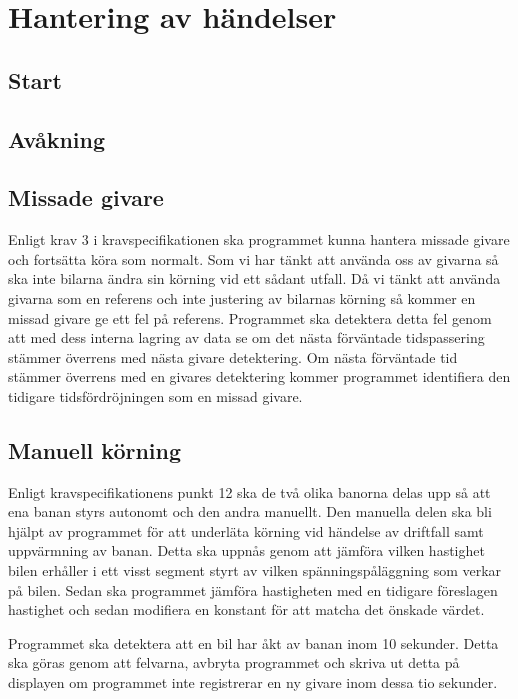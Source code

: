 \section{Hantering av händelser}


\subsection{Start}


\subsection{Avåkning}



\subsection{Missade givare}

Enligt krav 3 i kravspecifikationen ska programmet kunna hantera missade givare och fortsätta köra som normalt. Som vi har tänkt att använda oss av givarna så ska inte bilarna ändra sin körning vid ett sådant utfall. Då vi tänkt att använda givarna som en referens och inte justering av bilarnas körning så kommer en missad givare ge ett fel på referens. Programmet ska detektera detta fel genom att med dess interna lagring av data se om det nästa förväntade tidspassering stämmer överrens med nästa givare detektering. Om nästa förväntade tid stämmer överrens med en givares detektering kommer programmet identifiera den tidigare tidsfördröjningen som en missad givare.


\subsection{Manuell körning}
Enligt kravspecifikationens punkt 12 ska de två olika banorna delas upp så att ena banan styrs autonomt och den andra manuellt. 
Den manuella delen ska bli hjälpt av programmet för att underläta körning vid händelse av driftfall samt uppvärmning av banan.
Detta ska uppnås genom att jämföra vilken hastighet bilen erhåller i ett visst segment styrt av vilken spänningspåläggning som verkar på bilen.
Sedan ska programmet  jämföra hastigheten med en tidigare föreslagen hastighet och sedan modifiera en konstant för att matcha det önskade värdet.

Programmet ska detektera att en bil har åkt av banan inom 10 sekunder. Detta ska göras genom att felvarna, avbryta programmet och skriva ut detta på displayen om programmet inte registrerar en ny givare inom dessa tio sekunder.
